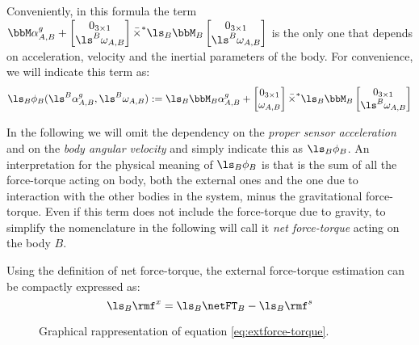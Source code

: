 Conveniently, in this formula the term $\bbM \alpha^g_{A,B} + \begin{bmatrix} 
0_{3\times1} \\
\ls^B \omega_{A,B} 
\end{bmatrix}
\bar{\times}^*
\ls_B \bbM_B
\begin{bmatrix} 
0_{3\times1} \\
\ls^B \omega_{A,B} 
\end{bmatrix}$ is the only one that depends  on acceleration, velocity and the inertial parameters of the body. For convenience, we will indicate this term as:
\begin{equation}
\ls_B \phi_B( \ls^B \alpha^g_{A,B}, \ls^B \omega_{A,B}) := \ls_B \bbM_B \alpha^g_{A,B} + \begin{bmatrix} 
0_{3\times1} \\
\omega_{A,B} 
\end{bmatrix}
\bar{\times}^*
\ls_B \bbM_B
\begin{bmatrix} 
0_{3\times1} \\
\ls^B \omega_{A,B} 
\end{bmatrix}
\end{equation}

In the following we will omit the dependency on the \emph{proper sensor acceleration} and on the \emph{body angular velocity} and simply indicate this as $\ls_B \phi_B$. An interpretation for the physical meaning of $\ls_B \phi_B$ is that is the sum of all the force-torque acting on body, both the external ones and the one due to interaction with the other bodies in the system, minus the gravitational force-torque. Even if this term does not include the force-torque due to gravity, to simplify the nomenclature in the following will call it \emph{net force-torque} acting on the body $B$.

Using the definition of net force-torque, the external force-torque estimation can be compactly expressed as:
\begin{equation}
\label{eq:extforce-torque}
    \ls_B \rmf^x = \ls_B \netFT_B -   \ls_B \rmf^s 
\end{equation}

\begin{figure}
\caption{Graphical rappresentation of equation \eqref{eq:extforce-torque}.}
\label{fig:extFTsSingleBody}
\end{figure}

